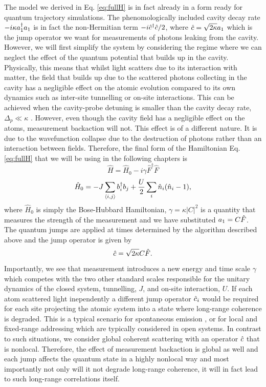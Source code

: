 The model we derived in Eq. \eqref{eq:fullH} is in fact already in a
form ready for quantum trajectory simulations. The phenomologically
included cavity decay rate $-i \kappa a^\dagger_1 a_1$ is in fact the
non-Hermitian term $-i \hat{c}^\dagger \hat{c} / 2$, where $\hat{c} = \sqrt{2 \kappa} a_1$
which is the jump operator we want for measurements of photons leaking
from the cavity. However, we will first simplify the system by
considering the regime where we can neglect the effect of the quantum
potential that builds up in the cavity. Physically, this means that
whilst light scatters due to its interaction with matter, the field
that builds up due to the scattered photons collecting in the cavity
has a negligible effect on the atomic evolution compared to its own
dynamics such as inter-site tunnelling or on-site interactions. This
can be achieved when the cavity-probe detuning is smaller than the
cavity decay rate, $\Delta_p \ll \kappa$
\cite{caballero2015}. However, even though the cavity field has a
negligible effect on the atoms, measurement backaction will not. This
effect is of a different nature. It is due to the wavefunction
collapse due to the destruction of photons rather than an interaction
between fields. Therefore, the final form of the Hamiltonian
Eq. \eqref{eq:fullH} that we will be using in the following chapters
is
\begin{equation}
  \label{eq:backaction}
  \hat{H} = \hat{H}_0 - i \gamma \hat{F}^\dagger \hat{F}
\end{equation}
\begin{equation}
  \hat{H}_0 = -J \sum_{\langle i, j \rangle} b^\dagger_i b_j + \frac{U}{2}
                \sum_i \hat{n}_i (\hat{n}_i - 1),
\end{equation}
where $\hat{H}_0$ is simply the Bose-Hubbard Hamiltonian,
$\gamma = \kappa |C|^2$ is a quantity that measures the strength of
the measurement and we have substituted $a_1 = C \hat{F}$. The
quantum jumps are applied at times determined by the algorithm
described above and the jump operator is given by
\begin{equation}
  \label{eq:jumpop}
  \hat{c} = \sqrt{2 \kappa} C \hat{F}.
\end{equation}
Importantly, we see that measurement introduces a new energy and time
scale $\gamma$ which competes with the two other standard scales
responsible for the unitary dynamics of the closed system, tunnelling,
$J$, and on-site interaction, $U$.  If each atom scattered light
inependently a different jump operator $\hat{c}_i$ would be required for
each site projecting the atomic system into a state where long-range
coherence is degraded. This is a typical scenario for spontaneous
emission \cite{pichler2010, sarkar2014}, or for local
\cite{syassen2008, kepesidis2012, vidanovic2014, bernier2014,
  daley2014} and fixed-range addressing \cite{ates2012, everest2014}
which are typically considered in open systems. In contrast to such
situations, we consider global coherent scattering with an operator
$\hat{c}$ that is nonlocal. Therefore, the effect of measurement backaction
is global as well and each jump affects the quantum state in a highly
nonlocal way and most importantly not only will it not degrade
long-range coherence, it will in fact lead to such long-range
correlations itself.

